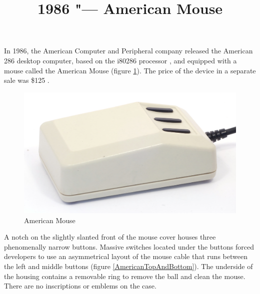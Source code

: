 \documentclass[11pt, a4paper]{article}
\begin{document}
\title{1986 "--- American Mouse}
\date{}
\maketitle
{}
In 1986, the American Computer and Peripheral company released the American 286 desktop computer, based on the i80286 processor \cite{adv}, and equipped with a mouse called the American Mouse (figure \ref{fig:AmericanPic}). The price of the device in a separate sale was \$125 \cite{review}.

\begin{figure}[h]
    \centering
    \includegraphics[scale=0.7]{1986_american_mouse/pic_30.jpg}
    \caption{American Mouse}
    \label{fig:AmericanPic}
\end{figure}

A notch on the slightly slanted front of the mouse cover houses three phenomenally narrow buttons. Massive switches located under the buttons forced developers to use an asymmetrical layout of the mouse cable that runs between the left and middle buttons (figure \ref{AmericanTopAndBottom}). The underside of the housing contains a removable ring to remove the ball and clean the mouse. There are no inscriptions or emblems on the case.
\end{document}
